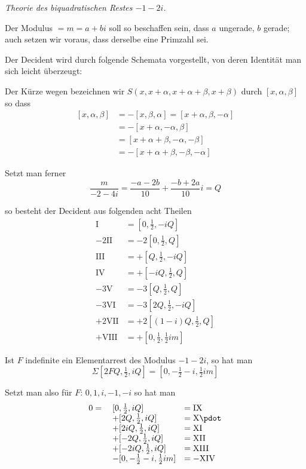 \begin{center}\emph{Theorie des biquadratischen Restes $-1-2i$.}\end{center}
Der Modulus $=m=a+bi$ soll so beschaffen sein, dass $a$ ungerade, $b$ gerade; auch setzen wir voraus, dass derselbe eine Primzahl sei.

Der Decident wird durch folgende Schemata vorgestellt, von deren Identität man sich leicht überzeugt:
\begin{center}\resizebox{\textwidth}{!}{}\end{center}

Der Kürze wegen bezeichnen wir $S(x,x+\alpha,x+\alpha+\beta,x+\beta)$ durch $[x,\alpha,\beta]$ so dass
\[
\begin{aligned}
[x,\alpha,\beta]&=-[x,\beta,\alpha]=[x+\alpha,\beta,-\alpha]\\
&=-[x+\alpha,-\alpha,\beta]\\
&=[x+\alpha+\beta,-\alpha,-\beta]\\
&=-[x+\alpha+\beta,-\beta,-\alpha]
\end{aligned}
\]

Setzt man ferner
\[
\frac{m}{-2-4i}=\frac{-a-2b}{10}+\frac{-b+2a}{10}i=Q
\]

so besteht der Decident aus folgenden acht Theilen
\[
\begin{aligned}
\mathrm{I}&=[0,\tfrac12,-iQ]\\
-2\mathrm{II}&=-2[0,\tfrac12,Q]\\
\mathrm{III}&=+[Q,\tfrac12,-iQ]\\
\mathrm{IV}&=+[-iQ,\tfrac12,Q]\\
-3\mathrm{V}&=-3[Q,\tfrac12,Q]\\
-3\mathrm{VI}&=-3[2Q,\tfrac12,-iQ]\\
+2\mathrm{VII}&=+2[(1-i)Q,\tfrac12,Q]\\
+\mathrm{VIII}&=+[0,\tfrac12,\tfrac12im]
\end{aligned}
\]

Ist $F$ indefinite ein Elementarrest des Modulus $-1-2i$, so hat man
\[
\Sigma[2FQ,\tfrac12,iQ]=[0,-\tfrac12-i,\tfrac12im]
\]

Setzt man also für $F$: $0,1,i,-1,-i$ so hat man
\[
\begin{array}{rll}
0={}&[0,\tfrac12,iQ]&=\mathrm{IX}\\
&+[2Q,\tfrac12,iQ]&=\mathrm{X}\pdot\\
&+[2iQ,\tfrac12,iQ]&=\mathrm{XI}\\
&+[-2Q,\tfrac12,iQ]&=\mathrm{XII}\\
&+[-2iQ,\tfrac12,iQ]&=\mathrm{XIII}\\
&-[0,-\tfrac12-i,\tfrac12im]&=-\mathrm{XIV}
\end{array}
\]


